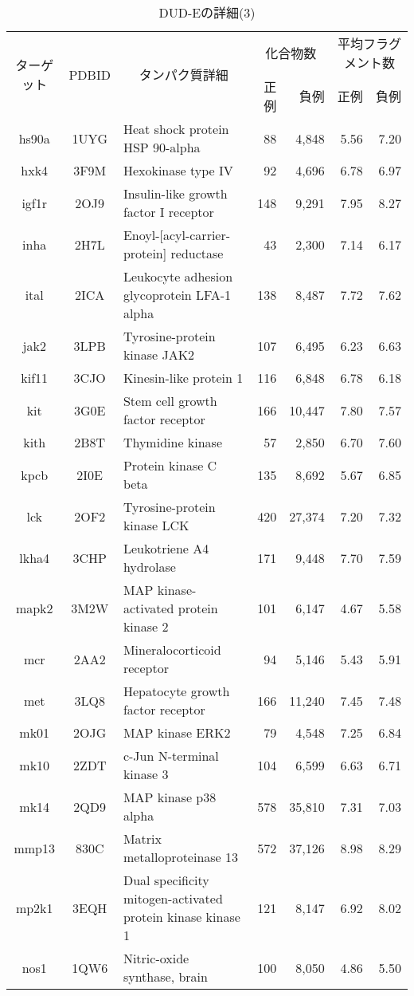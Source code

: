\begin{table}[t] \centering
	\caption{DUD-Eの詳細(3)}
	\label{tb:dude_description:3}
	\begin{tabular}{c|c|p{6cm}|rr|rr}
	\hline
	\multirow{2}{*}{ターゲット}	&\multirow{2}{*}{PDBID}	&\multicolumn{1}{c|}{\multirow{2}{*}{タンパク質詳細}}	&\multicolumn{2}{c|}{化合物数}	&\multicolumn{2}{c}{平均フラグメント数}		\\
							&					&											&正例	&負例				&正例	&負例						\\ \hline
hs90a&1UYG&Heat shock protein HSP 90-alpha&88&4,848&5.56&7.20 \\
hxk4&3F9M&Hexokinase type IV&92&4,696&6.78&6.97 \\
igf1r&2OJ9&Insulin-like growth factor I receptor&148&9,291&7.95&8.27 \\
inha&2H7L&Enoyl-[acyl-carrier-protein] reductase&43&2,300&7.14&6.17 \\
ital&2ICA&Leukocyte adhesion glycoprotein LFA-1 alpha&138&8,487&7.72&7.62 \\
jak2&3LPB&Tyrosine-protein kinase JAK2&107&6,495&6.23&6.63 \\
kif11&3CJO&Kinesin-like protein 1&116&6,848&6.78&6.18 \\
kit&3G0E&Stem cell growth factor receptor&166&10,447&7.80&7.57 \\
kith&2B8T&Thymidine kinase&57&2,850&6.70&7.60 \\
kpcb&2I0E&Protein kinase C beta&135&8,692&5.67&6.85 \\
lck&2OF2&Tyrosine-protein kinase LCK&420&27,374&7.20&7.32 \\
lkha4&3CHP&Leukotriene A4 hydrolase&171&9,448&7.70&7.59 \\
mapk2&3M2W&MAP kinase-activated protein kinase 2&101&6,147&4.67&5.58 \\
mcr&2AA2&Mineralocorticoid receptor&94&5,146&5.43&5.91 \\
met&3LQ8&Hepatocyte growth factor receptor&166&11,240&7.45&7.48 \\
mk01&2OJG&MAP kinase ERK2&79&4,548&7.25&6.84 \\
mk10&2ZDT&c-Jun N-terminal kinase 3&104&6,599&6.63&6.71 \\
mk14&2QD9&MAP kinase p38 alpha&578&35,810&7.31&7.03 \\
mmp13&830C&Matrix metalloproteinase 13&572&37,126&8.98&8.29 \\
mp2k1&3EQH&Dual specificity mitogen-activated protein kinase kinase 1&121&8,147&6.92&8.02 \\
nos1&1QW6&Nitric-oxide synthase, brain&100&8,050&4.86&5.50 \\

\end{tabular}
\end{table}
